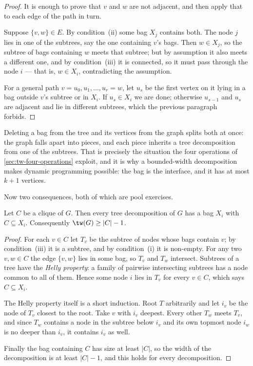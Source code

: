 \begin{proof}
It is enough to prove that $v$ and $w$ are not adjacent, and then apply that to
each edge of the path in turn.

Suppose $\{v,w\} \in E$. By condition~(ii) some bag $X_j$ contains both. The
node $j$ lies in one of the subtrees, say the one containing $v$'s bags. Then
$w \in X_j$, so the subtree of bags containing $w$ meets that subtree; but by
assumption it also meets a different one, and by condition~(iii) it is
connected, so it must pass through the node $i$ --- that is, $w \in X_i$,
contradicting the assumption.

For a general path $v = u_0, u_1, \ldots, u_r = w$, let $u_s$ be the first
vertex on it lying in a bag outside $v$'s subtree or in $X_i$. If $u_s \in X_i$
we are done; otherwise $u_{s-1}$ and $u_s$ are adjacent and lie in different
subtrees, which the previous paragraph forbids.
\end{proof}

\begin{intuition}
Deleting a bag from the tree and its vertices from the graph splits both at
once: the graph falls apart into pieces, and each piece inherits a tree
decomposition from one of the subtrees. That is precisely the situation the
four operations of \cref{sec:tw-four-operations} exploit, and it is why a
bounded-width decomposition makes dynamic programming possible: the bag is the
interface, and it has at most $k+1$ vertices.
\end{intuition}

Now two consequences, both of which are pool exercises.

\begin{proposition}\label{prop:tw-clique}
Let $C$ be a clique of $G$. Then every tree decomposition of $G$ has a bag $X_i$
with $C \subseteq X_i$. Consequently $\tw(G) \ge |C| - 1$.
\end{proposition}

\begin{proof}
For each $v \in C$ let $T_v$ be the subtree of nodes whose bags contain $v$; by
condition~(iii) it is a subtree, and by condition~(i) it is non-empty. For any
two $v,w \in C$ the edge $\{v,w\}$ lies in some bag, so $T_v$ and $T_w$
intersect. Subtrees of a tree have the \emph{Helly property}: a family of
pairwise intersecting subtrees has a node common to all of them. Hence some node
$i$ lies in $T_v$ for every $v \in C$, which says $C \subseteq X_i$.

The Helly property itself is a short induction. Root $T$ arbitrarily and let
$i_v$ be the node of $T_v$ closest to the root. Take $v$ with $i_v$ deepest.
Every other $T_w$ meets $T_v$, and since $T_w$ contains a node in the subtree
below $i_v$ and its own topmost node $i_w$ is no deeper than $i_v$, it contains
$i_v$ as well.

Finally the bag containing $C$ has size at least $|C|$, so the width of the
decomposition is at least $|C|-1$, and this holds for every decomposition.
\end{proof}

